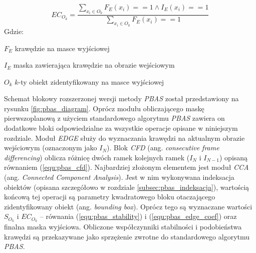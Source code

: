     \begin{equation}
        EC_{O_k} = \frac{ \sum_{x_i \in O_k} F_E(x_i) == 1 \land I_E(x_i) == 1 }{ \sum_{x_i \in O_k} F_E(x_i) == 1 }
    \label{equ:pbas_edge_coef}
    \end{equation}
Gdzie:
\begin{eqwhere}[2.2cm]
	\item[$F_E$] krawędzie na masce wyjściowej
	\item[$I_E$] maska zawierająca krawędzie na obrazie wejściowym
	\item[$O_k$] $k$-ty obiekt zidentyfikowany na masce wyjściowej
\end{eqwhere}


Schemat blokowy rozszerzonej wersji metody \textit{PBAS} został przedstawiony na rysunku \ref{fig:pbas_diagram}. Oprócz modułu obliczającego maskę pierwszoplanową z użyciem standardowego algorytmu \textit{PBAS} zawiera on dodatkowe bloki odpowiedzialne za wszystkie operacje opisane w niniejszym rozdziale. Moduł \textit{EDGE} służy do wyznaczania krawędzi na aktualnym obrazie wejściowym (oznaczonym jako $I_N$). Blok \textit{CFD} (ang. \textit{consecutive frame differencing}) oblicza różnicę dwóch ramek kolejnych ramek ($I_N$ i $I_{N-1}$) opisaną równaniem (\ref{equ:pbas_cfd}). Najbardziej złożonym elementem jest moduł \textit{CCA} (ang. \textit{Connected Component Analysis}). Jest w nim wykonywana indeksacja obiektów (opisana szczegółowo w rozdziale \ref{subsec:pbas_indeksacja}), wartością końcową tej operacji są parametry kwadratowego bloku otaczającego zidentyfikowany obiekt (ang. \textit{bounding box}). Oprócz tego są wyznaczane wartości $S_{O_k}$ i $EC_{O_k}$ -- równania (\ref{equ:pbas_stability}) i (\ref{equ:pbas_edge_coef}) oraz finalna maska wyjściowa. Obliczone współczynniki stabilności i podobieństwa krawędzi są przekazywane jako sprzężenie zwrotne do standardowego algorytmu \textit{PBAS}.

